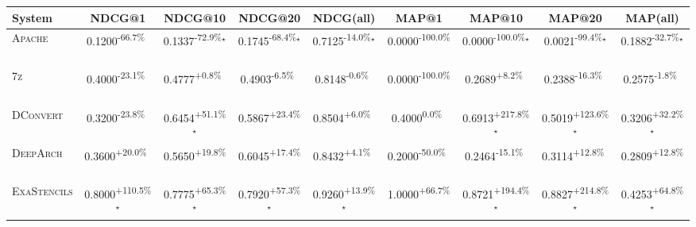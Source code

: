 \begin{table}[htbp]
\centering
\renewcommand{\arraystretch}{1.2}
\begin{tabular}{l|cccc|cccc}
\hline
System & NDCG@1 & NDCG@10 & NDCG@20 & NDCG(all) & MAP@1 & MAP@10 & MAP@20 & MAP(all) \\ \hline
\textsc{Apache} & \cellcolor{red!30}0.1200\textsuperscript{-66.7\%}$^{\,\,\,}$ & \cellcolor{red!30}0.1337\textsuperscript{-72.9\%}$^\star$ & \cellcolor{red!30}0.1745\textsuperscript{-68.4\%}$^\star$ & \cellcolor{red!30}0.7125\textsuperscript{-14.0\%}$^\star$ & \cellcolor{red!30}0.0000\textsuperscript{-100.0\%}$^{\,\,\,}$ & \cellcolor{red!30}0.0000\textsuperscript{-100.0\%}$^\star$ & \cellcolor{red!30}0.0021\textsuperscript{-99.4\%}$^\star$ & \cellcolor{red!30}0.1882\textsuperscript{-32.7\%}$^\star$ \\
\textsc{7z} & \cellcolor{red!30}0.4000\textsuperscript{-23.1\%}$^{\,\,\,}$ & \cellcolor{green!30}0.4777\textsuperscript{+0.8\%}$^{\,\,\,}$ & \cellcolor{red!30}0.4903\textsuperscript{-6.5\%}$^{\,\,\,}$ & \cellcolor{red!30}0.8148\textsuperscript{-0.6\%}$^{\,\,\,}$ & \cellcolor{red!30}0.0000\textsuperscript{-100.0\%}$^{\,\,\,}$ & \cellcolor{green!30}0.2689\textsuperscript{+8.2\%}$^{\,\,\,}$ & \cellcolor{red!30}0.2388\textsuperscript{-16.3\%}$^{\,\,\,}$ & \cellcolor{red!30}0.2575\textsuperscript{-1.8\%}$^{\,\,\,}$ \\
\textsc{DConvert} & \cellcolor{red!30}0.3200\textsuperscript{-23.8\%}$^{\,\,\,}$ & \cellcolor{green!30}0.6454\textsuperscript{+51.1\%}$^\star$ & \cellcolor{green!30}0.5867\textsuperscript{+23.4\%}$^{\,\,\,}$ & \cellcolor{green!30}0.8504\textsuperscript{+6.0\%}$^{\,\,\,}$ & \cellcolor{red!30}0.4000\textsuperscript{0.0\%}$^{\,\,\,}$ & \cellcolor{green!30}0.6913\textsuperscript{+217.8\%}$^\star$ & \cellcolor{green!30}0.5019\textsuperscript{+123.6\%}$^\star$ & \cellcolor{green!30}0.3206\textsuperscript{+32.2\%}$^\star$ \\
\textsc{DeepArch} & \cellcolor{green!30}0.3600\textsuperscript{+20.0\%}$^{\,\,\,}$ & \cellcolor{green!30}0.5650\textsuperscript{+19.8\%}$^{\,\,\,}$ & \cellcolor{green!30}0.6045\textsuperscript{+17.4\%}$^{\,\,\,}$ & \cellcolor{green!30}0.8432\textsuperscript{+4.1\%}$^{\,\,\,}$ & \cellcolor{red!30}0.2000\textsuperscript{-50.0\%}$^{\,\,\,}$ & \cellcolor{red!30}0.2464\textsuperscript{-15.1\%}$^{\,\,\,}$ & \cellcolor{green!30}0.3114\textsuperscript{+12.8\%}$^{\,\,\,}$ & \cellcolor{green!30}0.2809\textsuperscript{+12.8\%}$^{\,\,\,}$ \\
\textsc{ExaStencils} & \cellcolor{green!30}0.8000\textsuperscript{+110.5\%}$^\star$ & \cellcolor{green!30}0.7775\textsuperscript{+65.3\%}$^\star$ & \cellcolor{green!30}0.7920\textsuperscript{+57.3\%}$^\star$ & \cellcolor{green!30}0.9260\textsuperscript{+13.9\%}$^\star$ & \cellcolor{green!30}1.0000\textsuperscript{+66.7\%}$^{\,\,\,}$ & \cellcolor{green!30}0.8721\textsuperscript{+194.4\%}$^\star$ & \cellcolor{green!30}0.8827\textsuperscript{+214.8\%}$^\star$ & \cellcolor{green!30}0.4253\textsuperscript{+64.8\%}$^\star$ \\

\end{tabular}
\end{table}
